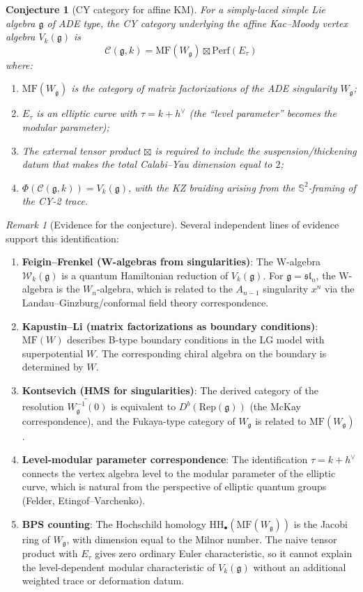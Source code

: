 \documentclass[11pt]{article}
\newtheorem{conjecture}[theorem]{Conjecture}
\theoremstyle{definition}
\theoremstyle{remark}
\newtheorem{remark}[theorem]{Remark}
\newcommand{\Rep}{\mathrm{Rep}}
\newcommand{\MF}{\mathrm{MF}}
\newcommand{\HH}{\mathrm{HH}}
\newcommand{\cC}{\mathcal{C}}
\newcommand{\frakg}{\mathfrak{g}}
\newcommand{\hv}{h^\vee}
\begin{document}
\begin{conjecture}[CY category for affine KM]
\label{conj:cy-category-km}
For a simply-laced simple Lie algebra $\frakg$ of ADE type, the CY
category underlying the affine Kac--Moody vertex algebra $V_k(\frakg)$
is
\[
 \cC(\frakg, k) = \MF(W_\frakg) \boxtimes \mathrm{Perf}(E_\tau)
\]
where:
\begin{enumerate}[label=(\roman*)]
 \item $\MF(W_\frakg)$ is the category of matrix factorizations of
 the ADE singularity $W_\frakg$;
 \item $E_\tau$ is an elliptic curve with $\tau = k + \hv$
 (the ``level parameter'' becomes the modular parameter);
 \item The external tensor product $\boxtimes$ is required to include
 the suspension/thickening datum that makes the total Calabi--Yau
 dimension equal to $2$;
 \item $\Phi(\cC(\frakg, k)) = V_k(\frakg)$, with the KZ braiding
 arising from the $\mathbb{S}^2$-framing of the CY-2 trace.
\end{enumerate}
\end{conjecture}

\begin{remark}[Evidence for the conjecture]
\label{rem:evidence}
Several independent lines of evidence support this identification:
\begin{enumerate}[label=(\alph*)]
 \item \textbf{Feigin--Frenkel (W-algebras from singularities)}:
 The W-algebra $\mathcal{W}_k(\frakg)$ is a quantum Hamiltonian
 reduction of $V_k(\frakg)$. For $\frakg = \mathfrak{sl}_n$, the
 W-algebra is the $W_n$-algebra, which is related to the $A_{n-1}$
 singularity $x^n$ via the Landau--Ginzburg/conformal field theory
 correspondence.
 \item \textbf{Kapustin--Li (matrix factorizations as boundary
 conditions)}: $\MF(W)$ describes B-type boundary conditions in the
 LG model with superpotential $W$. The corresponding chiral algebra
 on the boundary is determined by $W$.
 \item \textbf{Kontsevich (HMS for singularities)}: The derived category
 of the resolution $\widetilde{W_\frakg^{-1}(0)}$ is equivalent to
 $D^b(\Rep(\frakg))$ (the McKay correspondence), and the Fukaya-type
 category of $W_\frakg$ is related to $\MF(W_\frakg)$.
 \item \textbf{Level-modular parameter correspondence}: The identification
 $\tau = k + \hv$ connects the vertex algebra level to the modular
 parameter of the elliptic curve, which is natural from the perspective
 of elliptic quantum groups (Felder, Etingof--Varchenko).
 \item \textbf{BPS counting}: The Hochschild homology
 $\HH_\bullet(\MF(W_\frakg))$ is the Jacobi ring of $W_\frakg$,
 with dimension equal to the Milnor number. The naive tensor product
 with $E_\tau$ gives zero ordinary Euler characteristic, so it cannot
 explain the level-dependent modular characteristic of
 $V_k(\frakg)$ without an additional weighted trace or deformation
 datum.
\end{enumerate}
\end{remark}
\end{document}
